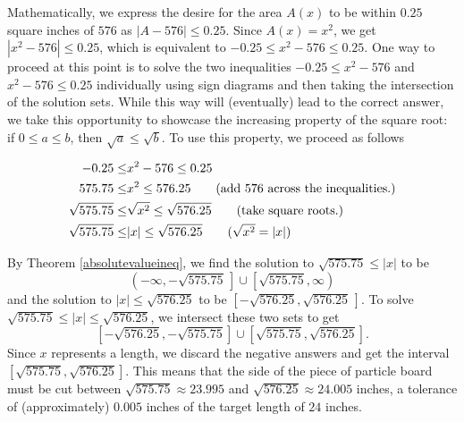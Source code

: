 {
Mathematically, we express the desire for the area $A(x)$ to be within $0.25$ square inches of $576$ as $|A - 576| \leq 0.25$.  Since $A(x) = x^2$, we get $|x^2 - 576| \leq 0.25$, which is equivalent to $-0.25 \leq x^2 - 576 \leq 0.25$.  One way to proceed at this point is to solve the two inequalities $-0.25 \leq x^2 - 576$ and $x^2 - 576 \leq 0.25$ individually using sign diagrams and then taking the intersection of the solution sets.  While this way will (eventually) lead to the correct answer, we take this opportunity to showcase the increasing property of the square root:  if $0 \leq a \leq b$, then $\sqrt{a} \leq \sqrt{b}$.  To use this property, we proceed as follows

\begin{align*}
-0.25  \leq & x^2 - 576  \leq 0.25  \\
575.75 \leq & x^2  \leq 576.25  \tag*{(add $576$ across the inequalities.)} \\
\sqrt{575.75} \leq & \sqrt{x^2}  \leq \sqrt{576.25}  \tag*{(take square roots.)} \\
\sqrt{575.75} \leq & |x|  \leq \sqrt{576.25}  \tag*{($\sqrt{x^2} = |x|$)}
\end{align*}

By Theorem \ref{absolutevalueineq}, we find the solution to $\sqrt{575.75} \leq |x|$ to be 
\[
\left(-\infty, -\sqrt{575.75} \, \right] \cup \left[\sqrt{575.75}, \infty \right)
\]
and the solution to $|x| \leq \sqrt{576.25}$ to be  $\left[-\sqrt{576.25}, \sqrt{576.25} \, \right]$. To solve $\sqrt{575.75} \leq  |x|  \leq \sqrt{576.25}$, we intersect these two sets to get 
\[
[-\sqrt{576.25}, -\sqrt{575.75}] \cup [\sqrt{575.75},\sqrt{576.25}].
\]
Since $x$ represents a length, we discard the negative answers and get  the interval $[\sqrt{575.75},\sqrt{576.25}]$.  This means that the side of the piece of particle board must be cut between $\sqrt{575.75} \approx 23.995$ and $\sqrt{576.25} \approx 24.005$ inches, a tolerance of (approximately) $0.005$ inches of the target length of $24$ inches. 
}

